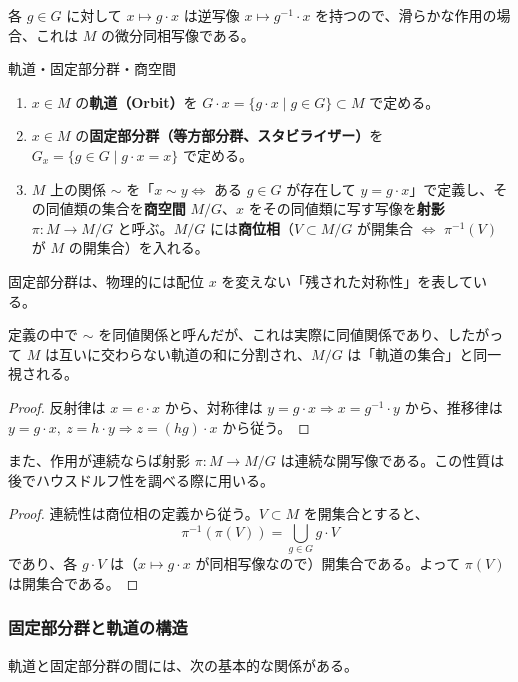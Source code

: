 \documentclass[uplatex, dvipdfmx, book]{jsbook}
\let\origsubsubsection\subsubsection
\renewcommand{\subsection}{\origsubsubsection}
\renewcommand{\subsubsection}{\paragraph}
\begin{document}
各 $g \in G$ に対して $x \mapsto g \cdot x$ は逆写像 $x \mapsto g^{-1} \cdot x$ を持つので、滑らかな作用の場合、これは $M$ の微分同相写像である。

\begin{mydef}{軌道・固定部分群・商空間}{}
\begin{enumerate}
    \item $x \in M$ の\textbf{軌道（Orbit）}を $G \cdot x = \{ g \cdot x \mid g \in G \} \subset M$ で定める。
    \item $x \in M$ の\textbf{固定部分群（等方部分群、スタビライザー）}を $G_x = \{ g \in G \mid g \cdot x = x \}$ で定める。
    \item $M$ 上の関係 $\sim$ を「$x \sim y \iff$ ある $g \in G$ が存在して $y = g \cdot x$」で定義し、その同値類の集合を\textbf{商空間} $M/G$、$x$ をその同値類に写す写像を\textbf{射影} $\pi: M \to M/G$ と呼ぶ。$M/G$ には\textbf{商位相}（$V \subset M/G$ が開集合 $\iff$ $\pi^{-1}(V)$ が $M$ の開集合）を入れる。
\end{enumerate}
\end{mydef}

固定部分群は、物理的には配位 $x$ を変えない「残された対称性」を表している。

定義の中で $\sim$ を同値関係と呼んだが、これは実際に同値関係であり、したがって $M$ は互いに交わらない軌道の和に分割され、$M/G$ は「軌道の集合」と同一視される。
\begin{proof}
反射律は $x = e \cdot x$ から、対称律は $y = g \cdot x \Rightarrow x = g^{-1} \cdot y$ から、推移律は $y = g \cdot x,\ z = h \cdot y \Rightarrow z = (hg) \cdot x$ から従う。
\end{proof}

また、作用が連続ならば射影 $\pi: M \to M/G$ は連続な開写像である。この性質は後でハウスドルフ性を調べる際に用いる。
\begin{proof}
連続性は商位相の定義から従う。$V \subset M$ を開集合とすると、
\begin{equation*}
    \pi^{-1}(\pi(V)) = \bigcup_{g \in G} g \cdot V
\end{equation*}
であり、各 $g \cdot V$ は（$x \mapsto g\cdot x$ が同相写像なので）開集合である。よって $\pi(V)$ は開集合である。
\end{proof}

\subsection{固定部分群と軌道の構造}

軌道と固定部分群の間には、次の基本的な関係がある。
\end{document}
